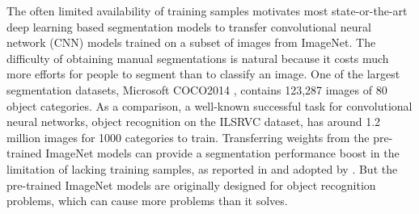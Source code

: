 
The often limited availability of training samples motivates most state-or-the-art deep learning based segmentation models \cite{long2015fully,chen2016deeplab,he2017mask} to transfer convolutional neural network (CNN) models \cite{krizhevsky2012imagenet,simonyan2014very,szegedy2015going,he2016deep} trained on a subset of images from ImageNet.
The difficulty of obtaining manual segmentations is natural because it costs much more efforts for people to segment than to classify an image.
One of the largest segmentation datasets, Microsoft COCO2014 \cite{lin2014microsoft}, contains 123,287 images of 80 object categories.
As a comparison, a well-known successful task for convolutional neural networks, object recognition on the ILSRVC dataset\cite{russakovsky2015imagenet}, has around 1.2 million images for 1000 categories to train.
Transferring weights from the pre-trained ImageNet models can provide a segmentation performance boost in the limitation of lacking training samples, as reported in \cite{long2015fully} and adopted by \cite{chen2016deeplab,he2017mask}.
But the pre-trained ImageNet models are originally designed for object recognition problems, which can cause more problems than it solves.

